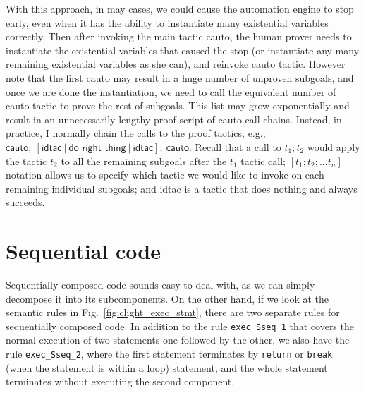With this approach, in may cases, we could cause the automation engine to stop early,
even when it has the ability to instantiate many existential variables correctly.
Then after invoking the main tactic \textsf{cauto}, the human prover needs to
instantiate the existential variables that caused the stop (or instantiate
any many remaining existential variables as she can), and reinvoke \textsf{cauto}
tactic. However note that the first \textsf{cauto} may result in a huge number
of unproven subgoals, and once we are done the instantiation, we need to call
the equivalent number of \textsf{cauto} tactic to prove the rest of subgoals.
This list may grow exponentially and result in an unnecessarily lengthy proof
script of \textsf{cauto} call chains.
Instead, in practice, I normally chain the calls to the proof tactics, e.g.,
$\textsf{cauto};~[\textsf{idtac}~|~\textsf{do\_right\_thing}~|~\textsf{idtac}];
~\textsf{cauto}$. 
Recall that a call to $t_1;t_2$ would apply the tactic $t_2$ to all the remaining
subgoals after the $t_1$ tactic call; $[t_1;t_2;...t_n]$ notation allows
us to specify which tactic we would like to invoke on each remaining individual
subgoals; and \textsf{idtac} is a tactic that does nothing and always succeeds.


\section{Sequential code}

Sequentially composed code sounds easy to deal with, as we can simply
decompose it into its subcomponents. On the other hand,
if we look at the semantic rules in Fig.~\ref{fig:clight_exec_stmt}, there are
two separate rules for sequentially composed code. In addition to the rule
\texttt{exec\_Sseq\_1} that covers the normal execution of two statements
one followed by the other, we also have the rule \texttt{exec\_Sseq\_2},
where the first statement terminates by \texttt{return} or \texttt{break}
(when the statement is within a loop) statement, and the whole statement
terminates without executing the second component.

